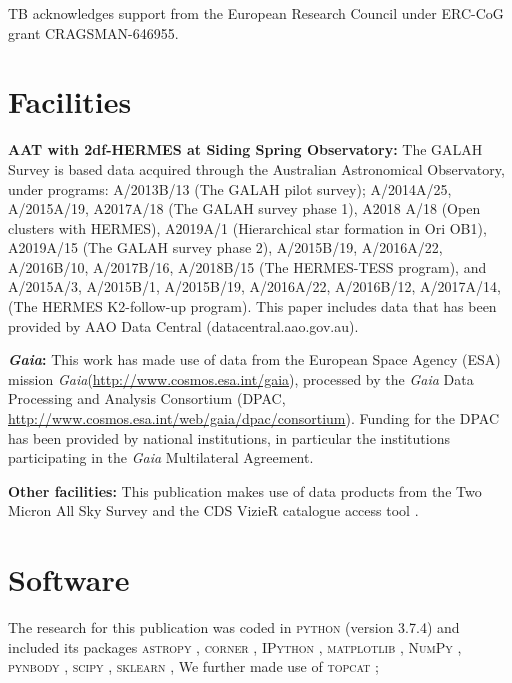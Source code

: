 \documentclass[fleqn,usenatbib]{mnras}
\newcommand{\Gaia}{\textit{Gaia}\xspace} %
\begin{document}
TB acknowledges support from the European Research Council under ERC-CoG grant CRAGSMAN-646955.

\section*{Facilities}

\textbf{AAT with 2df-HERMES at Siding Spring Observatory:}
The GALAH Survey is based data acquired through the Australian Astronomical Observatory, under programs: A/2013B/13 (The GALAH pilot survey); A/2014A/25, A/2015A/19, A2017A/18 (The GALAH survey phase 1), A2018 A/18 (Open clusters with HERMES), A2019A/1 (Hierarchical star formation in Ori OB1), A2019A/15 (The GALAH survey phase 2), A/2015B/19, A/2016A/22, A/2016B/10, A/2017B/16, A/2018B/15 (The HERMES-TESS program), and A/2015A/3, A/2015B/1, A/2015B/19, A/2016A/22, A/2016B/12, A/2017A/14, (The HERMES K2-follow-up program). This paper includes data that has been provided by AAO Data Central (datacentral.aao.gov.au).

\textbf{\Gaia: } This work has made use of data from the European Space Agency (ESA) mission \Gaia (\url{http://www.cosmos.esa.int/gaia}), processed by the \Gaia Data Processing and Analysis Consortium (DPAC, \url{http://www.cosmos.esa.int/web/gaia/dpac/consortium}). Funding for the DPAC has been provided by national institutions, in particular the institutions participating in the \Gaia Multilateral Agreement. 

\textbf{Other facilities:} This publication makes use of data products from the Two Micron All Sky Survey \citep{Skrutskie2006} and the CDS VizieR catalogue access tool \citep{Vizier2000}.

\section*{Software}

The research for this publication was coded in \textsc{python} (version 3.7.4) and included its packages
\textsc{astropy} \citep[v. 3.2.2;][]{Robitaille2013,PriceWhelan2018},
\textsc{corner} \citep[v. 2.0.1;][]{corner},
\textsc{IPython} \citep[v. 7.8.0;][]{ipython},
\textsc{matplotlib} \citep[v. 3.1.3;][]{matplotlib},
\textsc{NumPy} \citep[v. 1.17.2;][]{numpy},
\textsc{pynbody} \citep[v. 1.1.0;][]{pynbody},
\textsc{scipy} \citep[version 1.3.1;][]{scipy},
\textsc{sklearn} \citep[v. 0.21.3;][]{scikit-learn},
We further made use of \textsc{topcat} \citep[version 4.7;][]{Taylor2005};
\end{document}
